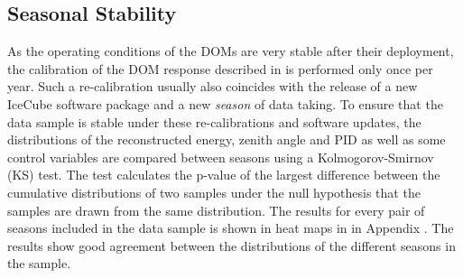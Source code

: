 \subsection{Seasonal Stability}
\label{sec:sample-stability}
As the operating conditions of the DOMs are very stable after their deployment, the calibration of the DOM response described in  is performed only once per year. Such a re-calibration usually also coincides with the release of a new IceCube software package and a new \emph{season} of data taking. To ensure that the data sample is stable under these re-calibrations and software updates, the distributions of the reconstructed energy, zenith angle and PID as well as some control variables are compared between seasons using a Kolmogorov-Smirnov (KS) test. The test calculates the p-value of the largest difference between the cumulative distributions of two samples under the null hypothesis that the samples are drawn from the same distribution. The results for every pair of seasons included in the data sample is shown in heat maps in  in Appendix . The results show good agreement between the distributions of the different seasons in the sample.
